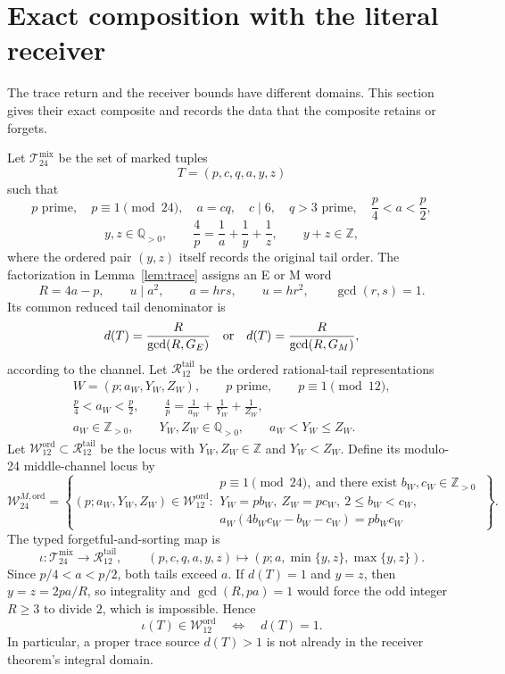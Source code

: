 \section{Exact composition with the literal receiver}\label{sec:receiver-bridge}

The trace return and the receiver bounds have different domains.  This
section gives their exact composite and records the data that the composite
retains or forgets.

Let \(\mathcal T_{24}^{\mathrm{mix}}\) be the set of marked tuples
\[
 T=(p,c,q,a,y,z)
\]
such that
\[
 p\text{ prime},\quad p\equiv1\pmod {24},\quad
 a=cq,\quad c\mid6,\quad q>3\text{ prime},
 \quad \frac p4<a<\frac p2,
\]
\[
 y,z\in\mathbb Q_{>0},\qquad
 \frac4p=\frac1a+\frac1y+\frac1z,\qquad y+z\in\mathbb Z,
\]
where the ordered pair \((y,z)\) itself records the original tail order.  The
factorization in Lemma~\ref{lem:trace} assigns an E or M word
\[
 R=4a-p,\qquad u\mid a^2,\qquad
 a=hrs,\qquad u=hr^2,\qquad \gcd(r,s)=1.
\]
Its common reduced tail denominator is
\[
 d(T)=\frac{R}{\gcd(R,G_E)}
 \quad\hbox{or}\quad
 d(T)=\frac{R}{\gcd(R,G_M)},
\]
according to the channel.  Let \(\mathcal R_{12}^{\mathrm{tail}}\) be the
ordered rational-tail representations
\[
 \begin{gathered}
 W=(p;a_W,Y_W,Z_W),\qquad p\text{ prime},\qquad
 p\equiv1\pmod {12},\\
 \frac p4<a_W<\frac p2,\qquad
 \frac4p=\frac1{a_W}+\frac1{Y_W}+\frac1{Z_W},\\
 a_W\in\mathbb Z_{>0},\qquad Y_W,Z_W\in\mathbb Q_{>0},\qquad
 a_W<Y_W\le Z_W.
 \end{gathered}
\]
Let \(\mathcal W_{12}^{\mathrm{ord}}\subset\mathcal R_{12}^{\mathrm{tail}}\)
be the locus with \(Y_W,Z_W\in\mathbb Z\) and \(Y_W<Z_W\).  Define its
modulo-24 middle-channel locus by
\[
 \mathcal W_{24}^{M,\mathrm{ord}}
 =\left\{
 (p;a_W,Y_W,Z_W)\in\mathcal W_{12}^{\mathrm{ord}}:
 \begin{array}{l}
 p\equiv1\pmod {24},\ \text{and there exist }b_W,c_W\in\mathbb Z_{>0}\ \\[2pt]
 Y_W=pb_W,\ Z_W=pc_W,\ 2\le b_W<c_W,\\[2pt]
 a_W(4b_Wc_W-b_W-c_W)=pb_Wc_W
 \end{array}
 \right\}.
\]
The typed
forgetful-and-sorting map is
\[
 \iota:\mathcal T_{24}^{\mathrm{mix}}\longrightarrow
 \mathcal R_{12}^{\mathrm{tail}},\qquad
 (p,c,q,a,y,z)\longmapsto
 (p;a,\min\{y,z\},\max\{y,z\}).
\]
Since \(p/4<a<p/2\), both tails exceed \(a\).  If \(d(T)=1\) and \(y=z\),
then \(y=z=2pa/R\), so integrality and \(\gcd(R,pa)=1\) would force the odd
integer \(R\ge3\) to divide \(2\), which is impossible.  Hence
\[
 \iota(T)\in\mathcal W_{12}^{\mathrm{ord}}
 \quad\Longleftrightarrow\quad d(T)=1.
\]
In particular, a proper trace source \(d(T)>1\) is not already in the
receiver theorem's integral domain.

